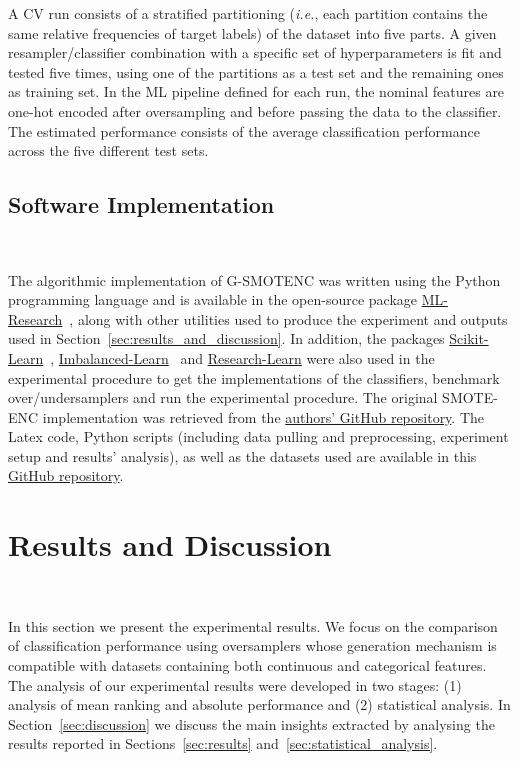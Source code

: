\documentclass[parskip=full]{scrartcl}
\begin{document}
A CV run consists of a stratified partitioning (\textit{i.e.}, each partition
contains the same relative frequencies of target labels) of the dataset into
five parts. A given resampler/classifier combination with a specific set of
hyperparameters is fit and tested five times, using one of the partitions as a
test set and the remaining ones as training set. In the ML pipeline defined
for each run, the nominal features are one-hot encoded after oversampling and
before passing the data to the classifier. The estimated performance consists
of the average classification performance across the five different test sets. 

\subsection{Software Implementation}~\label{sec:software_implementation}

The algorithmic implementation of G-SMOTENC was written using the Python
programming language and is available in the open-source package
\href{https://github.com/joaopfonseca/ml-research}{ML-Research}~\cite{fonseca2021increasing},
along with other utilities used to produce the experiment and outputs used in
Section~\ref{sec:results_and_discussion}. In addition, the packages
\href{https://github.com/scikit-learn/scikit-learn/}{Scikit-Learn}~\cite{scikit-learn},
\href{https://github.com/scikit-learn-contrib/imbalanced-learn}{Imbalanced-Learn}~\cite{JMLR:v18:16-365}
and \href{https://github.com/georgedouzas/research-learn/}{Research-Learn}
were also used in the experimental procedure to get the implementations of the
classifiers, benchmark over/undersamplers and run the experimental procedure.
The original SMOTE-ENC implementation was retrieved from the
\href{https://github.com/Mimimkh/SMOTE-ENC-code}{authors' GitHub repository}.
The Latex code, Python scripts (including data pulling and preprocessing,
experiment setup and results' analysis), as well as the datasets used are
available in this \href{https://github.com/joaopfonseca/publications}{GitHub
repository}.
 

\section{Results and Discussion}~\label{sec:results_and_discussion}

In this section we present the experimental results. We focus on the
comparison of classification performance using oversamplers whose generation
mechanism is compatible with datasets containing both continuous and
categorical features. The analysis of our experimental results were developed
in two stages: (1) analysis of mean ranking and absolute performance and (2)
statistical analysis. In Section~\ref{sec:discussion} we discuss the main
insights extracted by analysing the results reported in
Sections~\ref{sec:results} and~\ref{sec:statistical_analysis}.
\end{document}
